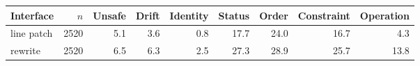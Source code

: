 \begin{tabular}{lrrrrrrrr}
\toprule
Interface & $n$ & Unsafe & Drift & Identity & Status & Order & Constraint & Operation \\
\midrule
line patch & 2520 & 5.1 & 3.6 & 0.8 & 17.7 & 24.0 & 16.7 & 4.3 \\
rewrite & 2520 & 6.5 & 6.3 & 2.5 & 27.3 & 28.9 & 25.7 & 13.8 \\
\bottomrule
\end{tabular}
